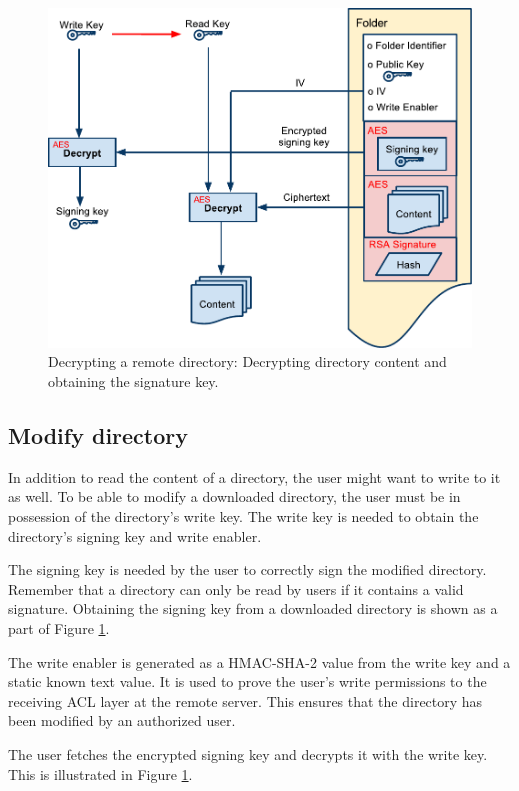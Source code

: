 \documentclass[pdftex,english,10pt,b5paper,twoside]{book}
\begin{document}
\begin{figure}[h!]
    \centering
    \includegraphics[width=\columnwidth]{OpenFolder.pdf}
    \caption{Decrypting a remote directory: Decrypting directory content and
    obtaining the signature key.}
    \label{fig:CS:OD}
\end{figure}

\subsection{Modify directory}
In addition to read the content of a directory, the user might want to write to it as well. 
To be able to modify a downloaded directory, the user must be in possession of
the directory's write key. The write key is needed to obtain the directory's
signing key and write enabler. 

The signing key is needed by the user to correctly sign the
modified directory. Remember that a directory can only be read by users if it
contains a valid signature. Obtaining the signing key from a downloaded
directory is shown as a part of Figure \ref{fig:CS:OD}.

The write enabler is generated as a HMAC-SHA-2 value from the write key and a
static known text value. It is used to prove the user's write permissions to the
receiving ACL layer at the remote server. This ensures that the directory has
been modified by an authorized user.

The user fetches the encrypted signing key and decrypts it with the
write key. This is illustrated in Figure \ref{fig:CS:OD}.
\end{document}
